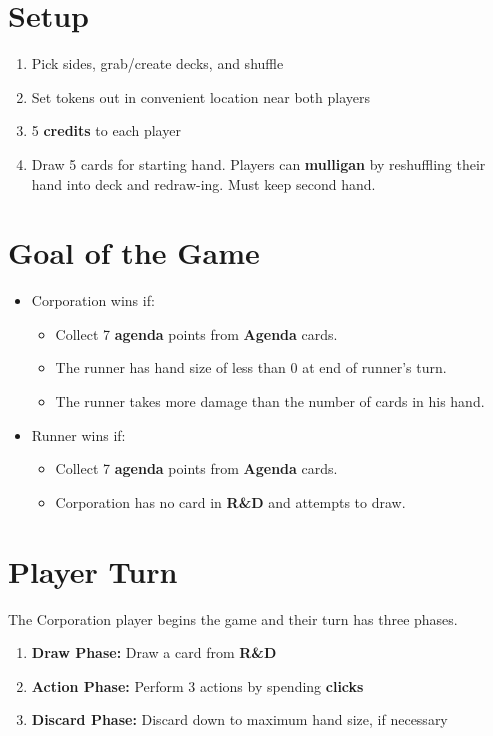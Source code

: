 \documentclass[12pt]{article}
\newenvironment{enumerateCustom}
{\begin{enumerate}
  \setlength{\itemsep}{1pt}
  \setlength{\parskip}{0pt}
  \setlength{\parsep}{0pt}}
{\end{enumerate}}
\newenvironment{itemizeCustom}
{\begin{itemize}
  \setlength{\itemsep}{1pt}
  \setlength{\parskip}{0pt}
  \setlength{\parsep}{0pt}}
{\end{itemize}}
\begin{document}
\begin{mdframed}[style = customFrame]
\begin{multicols*}{2}

\section*{Setup}
\begin{enumerateCustom}
	\item Pick sides, grab/create decks, and shuffle
	\item Set tokens out in convenient location near both players
	\item 5 \textbf{credits} to each player
	\item Draw 5 cards for starting hand. Players can \textbf{mulligan} by reshuffling their hand into deck and redraw-ing. Must keep second hand.
\end{enumerateCustom}

\section*{Goal of the Game}
\begin{itemizeCustom}
	\item Corporation wins if:
		\begin{itemizeCustom}
			\item Collect 7 \textbf{agenda} points from \textbf{Agenda} cards.
			\item The runner has hand size of less than 0 at end of runner's turn.
			\item The runner takes more damage than the number of cards in his hand.
		\end{itemizeCustom}
	\item Runner wins if:
		\begin{itemizeCustom}
			\item Collect 7 \textbf{agenda} points from \textbf{Agenda} cards.
			\item Corporation has no card in \textbf{R\&D} and attempts to draw.
		\end{itemizeCustom}
\end{itemizeCustom}

\section*{Player Turn}
The Corporation player begins the game and their turn has three phases.
\begin{enumerateCustom}
	\item \textbf{Draw Phase:} Draw a card from \textbf{R\&D}
	\item \textbf{Action Phase:} Perform 3 actions by spending \textbf{clicks}
	\item \textbf{Discard Phase:} Discard down to maximum hand size, if necessary
\end{enumerateCustom}


\end{multicols*}
\end{mdframed}
\end{document}
